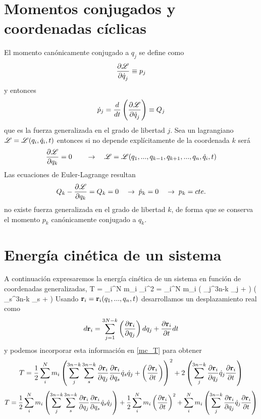 \documentclass[10pt,oneside]{CBFT_book}
\begin{document}
\section{Momentos conjugados y coordenadas cíclicas}

El momento canónicamente conjugado a $q_j$ se define como 
\[
	\frac{\partial^{\hspace{-0.05em}} {\mathscr{L}}}{\partial {\dot{q}_j}^{\hspace{-0.05em}}} \equiv p_j
\]
y entonces 
\[
	\dot{p}_j = \frac{d}{dt}\left( \frac{\partial^{\hspace{-0.05em}} {\mathscr{L}}}{\partial {\dot{q}_j}^{\hspace{-0.05em}}} \right) \equiv Q_j
\]
que es la fuerza generalizada en el grado de libertad $j$.
Sea un lagrangiano $\mathscr{L} = \mathscr{L}( q_i,\dot{q}_i, t )$ entonces si no depende explícitamente
de la coordenada $k$ será
\[
	\frac{\partial^{\hspace{-0.05em}} {\mathscr{L}}}{\partial {q_k}^{\hspace{-0.05em}}}= 0 \qquad \rightarrow \quad \mathscr{L} = \mathscr{L}( q_1,...,q_{k-1},q_{k+1},...,q_n,\dot{q}_i, t )
\]
Las ecuaciones de Euler-Lagrange resultan 
\[
	Q_k - \frac{\partial^{\hspace{-0.05em}} {\mathscr{L}}}{\partial {q_k}^{\hspace{-0.05em}}} = Q_k = 0 \quad \rightarrow \;\dot{p}_k = 0 \quad \rightarrow \; p_k = cte.
\]
no existe fuerza generalizada en el grado de libertad $k$, de forma que se conserva el momento
$p_k$ canónicamente conjugado a $q_k$.

\section{Energía cinética de un sistema}

A continuación expresaremos la energía cinética de un sistema en función de coordenadas generalizadas,
\be
	T =  \sum_i^N m_i _i^2 =
	 \sum_i^N m_i \left( \sum_j^{3n-k}  _j +  \right)
	\left( \sum_s^{3n-k} _s +  \right) 
\label{mc_T}
\ee
Usando $\vb{r}_i = \vb{r}_i(q_1, ...,q_n,t)$ desarrollamos un desplazamiento real como
\[
	d\vb{r}_i = \sum_{j=1}^{3N-k} \left( \dpar{\vb{r}_i}{q_j} \right) dq_j + \dpar{\vb{r}_i}{t} dt
\]
y podemos incorporar esta información en \eqref{mc_T} para obtener
\[
	T = 
	\frac{1}{2} \sum_i^N m_i \left( \sum_j^{3n-k}\sum_s^{3n-k}  
	\dpar{\vb{r}_i}{q_j}\dpar{\vb{r}_i}{q_s}\dot{q}_s\dot{q}_j + 
	\left( \dpar{\vb{r}_i}{t} \right) \right)^2 +
	2 \left( \sum_j^{3n-k} \dpar{\vb{r}_i}{q_j}\dot{q}_j\dpar{\vb{r}_i}{t} \right) 
\]
\[
	T = 
	\frac{1}{2} \sum_i^N m_i \left( \sum_j^{3n-k}\sum_s^{3n-k}  
	\dpar{\vb{r}_i}{q_j}\dpar{\vb{r}_i}{q_s}\dot{q}_s\dot{q}_j  \right) + 
	\frac{1}{2} \sum_i^N m_i \left( \dpar{\vb{r}_i}{t} \right)^2 +
	\sum_i^N m_i \left( \sum_j^{3n-k} \dpar{\vb{r}_i}{q_j}\dot{q}_j\dpar{\vb{r}_i}{t} \right) 
\]
\end{document}
